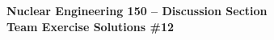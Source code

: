 \documentclass{report}
\begin{document}
\begin{center}
\textbf{\large Nuclear Engineering 150 -- Discussion Section}\\ 
\textbf{Team Exercise Solutions \#12}
\end{center}



\newpage



\end{document}
